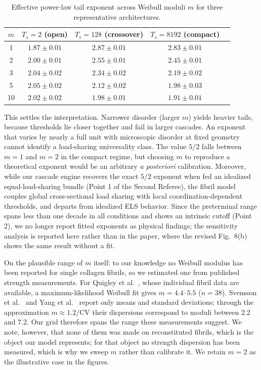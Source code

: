 \documentclass[11pt]{article}
\begin{document}
\begin{table}[H]
\centering\small
\begin{tabular}{ccccc}
\hline
$m$ & $T_s=2$ (open) & $T_s=128$ (crossover) & $T_s=8192$ (compact)\\
\hline
1  & $1.87\pm0.01$ & $2.87\pm0.01$ & $2.83\pm0.01$\\
2  & $2.00\pm0.01$ & $2.55\pm0.01$ & $2.45\pm0.01$\\
3  & $2.04\pm0.02$ & $2.34\pm0.02$ & $2.19\pm0.02$\\
5  & $2.05\pm0.02$ & $2.12\pm0.02$ & $1.98\pm0.03$\\
10 & $2.02\pm0.02$ & $1.98\pm0.01$ & $1.91\pm0.01$\\
\hline
\end{tabular}
\caption{Effective power-law tail exponent across Weibull moduli $m$ for three
representative architectures.}
\end{table}

This settles the interpretation. Narrower disorder (larger $m$) yields heavier
tails, because thresholds lie closer together and fail in larger cascades. An
exponent that varies by nearly a full unit with microscopic disorder at fixed
geometry cannot identify a load-sharing universality class. The value $5/2$
falls between $m=1$ and $m=2$ in the compact regime, but choosing $m$ to
reproduce a theoretical exponent would be an arbitrary \textit{a posteriori}
calibration. Moreover, while our cascade engine recovers the exact $5/2$
exponent when fed an idealized equal-load-sharing bundle (Point 1 of the Second
Referee), the fibril model couples global cross-sectional load sharing with
local coordination-dependent thresholds, and departs from idealized ELS
behavior. Since the preterminal range spans less than one decade in all
conditions and shows an intrinsic cutoff (Point 2), we no longer report fitted
exponents as physical findings; the sensitivity analysis is reported here rather
than in the paper, where the revised Fig.~8(b) shows the same result without a
fit.

On the plausible range of $m$ itself: to our knowledge no Weibull modulus has
been reported for single collagen fibrils, so we estimated one from published
strength measurements. For Quigley et al.~\cite{Quigley2018}, whose individual
fibril data are available, a maximum-likelihood Weibull fit gives $m=4.4$--$5.5$
($n=38$). Svensson et al.~\cite{Svensson2013} and Yang et
al.~\cite{Yang2012} report only means and standard deviations; through the
approximation $m\approx1.2/\mathrm{CV}$ their dispersions correspond to moduli
between 2.2 and 7.2. Our grid therefore spans the range these measurements
suggest. We note, however, that none of them was made on reconstituted fibrils,
which is the object our model represents; for that object no strength dispersion
has been measured, which is why we sweep $m$ rather than calibrate it. We retain
$m=2$ as the illustrative case in the figures.
\end{document}
